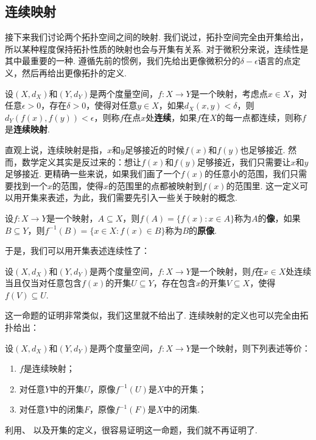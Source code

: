 \subsection{连续映射}
接下来我们讨论两个拓扑空间之间的映射. 我们说过，拓扑空间完全由开集给出，所以某种程度保持拓扑性质的映射也会与开集有关系. 对于微积分来说，连续性是其中最重要的一种. 遵循先前的惯例，我们先给出更像微积分的$\delta-\epsilon$语言的点定义，然后再给出更像拓扑的定义. 

\begin{definition}[连续映射]
    设$(X,d_X)$和$(Y,d_Y)$是两个度量空间，$f:X\to Y$是一个映射，考虑点$x\in X$，对任意$\epsilon>0$，存在$\delta>0$，使得对任意$y\in X$，如果$d_X(x,y)<\delta$，则$d_Y(f(x),f(y))<\epsilon$，则称$f$在点$x$处\textbf{连续}，如果$f$在$X$的每一点都连续，则称$f$是\textbf{连续映射}. 
\end{definition}

直观上说，连续映射是指，$x$和$y$足够接近的时候$f(x)$和$f(y)$也足够接近. 然而，数学定义其实是反过来的：想让$f(x)$和$f(y)$足够接近，我们只需要让$x$和$y$足够接近. 更精确一些来说，如果我们画了一个$f(x)$的任意小的范围，我们只需要找到一个$x$的范围，使得$x$的范围里的点都被映射到$f(x)$的范围里. 这一定义可以用开集来表述，为此，我们需要先引入一些关于映射的概念. 

\begin{definition}[像，原像]
    设$f:X\to Y$是一个映射，$A\subseteq X$，则$f(A)=\{f(x):x\in A\}$称为$A$的\textbf{像}，如果$B\subseteq Y$，则$f^{-1}(B)=\{x\in X:f(x)\in B\}$称为$B$的\textbf{原像}. 
\end{definition}

于是，我们可以用开集表述连续性了：

\begin{proposition}\label{prop:continuous-open}
    设$(X,d_X)$和$(Y,d_Y)$是两个度量空间，$f:X\to Y$是一个映射，则$f$在$x\in X$处连续当且仅当对任意包含$f(x)$的开集$U\subseteq Y$，存在包含$x$的开集$V\subseteq X$，使得$f(V)\subseteq U$.
\end{proposition}
这一命题的证明非常类似，我们这里就不给出了. 连续映射的定义也可以完全由拓扑给出：

\begin{proposition}\label{prop:continuous-topology}
    设$(X,d_X)$和$(Y,d_Y)$是两个度量空间，$f:X\to Y$是一个映射，则下列表述等价：
    \begin{enumerate}
        \item $f$是连续映射；
        \item 对任意$Y$中的开集$U$，原像$f^{-1}(U)$是$X$中的开集；
        \item 对任意$Y$中的闭集$F$，原像$f^{-1}(F)$是$X$中的闭集. 
    \end{enumerate}
\end{proposition}
利用、 以及开集的定义，很容易证明这一命题，我们就不再证明了. 

